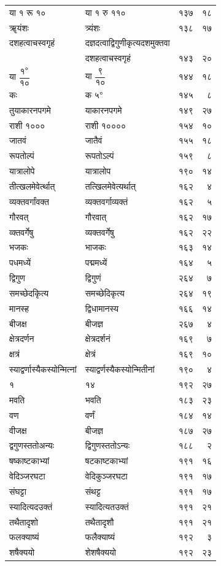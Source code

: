 \documentclass[11pt, openany]{book}
\begin{document}
{\begin{longtable}{llrr}
\newpage
या १ रू १०& या १ रु ११०& १३७& १८\\
ॠयंशः &त्र्यंशः & १३८& १७\\
दशहत्वाचस्वगृहं &दज्ञदत्वाद्विगुणीकृत्यदशमुक्तवा&&\\
&दशहत्वाचस्वगृहं &१४३& २०\\
या $\dfrac{\mbox{१}^{\text{०}}}{\mbox{१०}}$& या $\dfrac{\mbox{९}}{\mbox{१०}}$ &१४४& १८\\
कः& क ५$^{\text{०}}$& १४५& ८\\
तुयाकारनपगमे &याकारनपगमे &१४९& २७\\
राशी १००० &राशी १००००& १५४& १०\\
जातवं& जातैवं &१५५& १८\\
रूपतोल्पं &रूपतोऽल्पं &१५९& ८\\
यात्रालोपे &यात्रालोप &१९०& १४\\
तीत्खलमेवेर्त्थात् &तत्खिलमेवेत्यर्थात् &१६२& ४\\
व्यक्तवर्गांवक्त &व्यक्तवर्गाव्यक्तं& १६२& ५\\
गौरवत् &गौरवात् &१६२ &१७\\
व्क्तवर्गेषु &व्यक्तवर्गेषु &१६२& २२\\
भजकः &भाजकः &१६३& १४\\
पधमध्यें &पद्ममध्यें &१६४& ५\\
द्विगुण& द्विगुणं &२६४& ७\\
समच्छेदकृित्य &समच्छेदिकृत्य &२६४& १९\\
मानस्ह &द्विधामानस्य &१६६& १४\\
बीजक्ष &बीजज्ञ &२६७& ४\\
क्षेत्रदर्णन &क्षेत्रदर्शनं &१६९& ७\\
क्षत्रं &क्षेत्रं &१६९& १०\\
स्याद्वर्णास्यैकस्योन्मित्नां &स्याद्वर्णस्यैकस्योन्मितीनां &१९०& ४\\
१& १४& १९२& २७\\
मवति& भवति& १८३& २३\\
वण &वर्णं &१८४& १४\\
वीजक्ष &बीजज्ञ& १८७& २७\\

\newpage
द्वगुणस्ततोअन्यः &द्विगुणस्ततोऽन्यः &१८८& २\\
षष्काष्टकाभ्यां& षटकाष्टकाभ्यां &१९१& १६\\
वेदिञ्जरघटा &वेदिकुञ्जरघटा &१९१& १७\\
संघट्टा &संथट्ट &१९१& १७\\
स्यादित्यदउक्तं& स्यादित्यतउक्तं &१९१& २१\\
तथैतादृशो &तथैतादृशौ &१९१& २१\\
फलक्याष्यं &फलैक्याष्यं &१९२& ३\\
शषैक्ययो &शेशषैक्ययो &१९२& २३
\end{longtable}}
\vspace{1cm}
\end{document}
